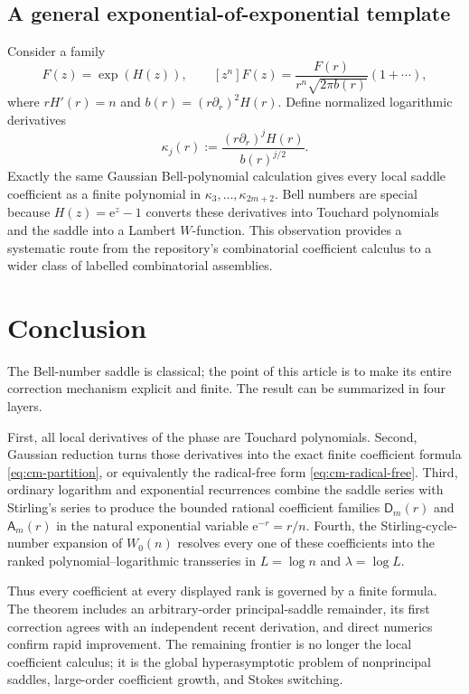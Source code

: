 \documentclass[11pt,a4paper]{article}
\theoremstyle{definition}
\theoremstyle{remark}
\newcommand{\ee}{\mathrm e}
\newcommand{\cA}{\mathsf A}
\newcommand{\cD}{\mathsf D}
\begin{document}
\subsection{A general exponential-of-exponential template}

Consider a family
\begin{equation}\label{eq:general-template}
 F(z)=\exp(H(z)),
 \qquad
 [z^n]F(z)=\frac{F(r)}{r^n\sqrt{2\pi b(r)}}
           \left(1+\cdots\right),
\end{equation}
where \(rH'(r)=n\) and
\(b(r)=(r\partial_r)^2H(r)\).  Define normalized logarithmic derivatives
\begin{equation}\label{eq:general-cumulants}
 \kappa_j(r):=\frac{(r\partial_r)^jH(r)}{b(r)^{j/2}}.
\end{equation}
Exactly the same Gaussian Bell-polynomial calculation gives every local
saddle coefficient as a finite polynomial in
\(\kappa_3,\ldots,\kappa_{2m+2}\).  Bell numbers are special because
\(H(z)=\ee^z-1\) converts these derivatives into Touchard polynomials and the
saddle into a Lambert \(W\)-function.  This observation provides a systematic
route from the repository's combinatorial coefficient calculus to a wider
class of labelled combinatorial assemblies.

\section{Conclusion}\label{sec:conclusion}

The Bell-number saddle is classical; the point of this article is to make its
entire correction mechanism explicit and finite.  The result can be summarized
in four layers.

First, all local derivatives of the phase are Touchard polynomials.  Second,
Gaussian reduction turns those derivatives into the exact finite coefficient
formula \cref{eq:cm-partition}, or equivalently the radical-free form
\cref{eq:cm-radical-free}.  Third, ordinary logarithm and exponential
recurrences combine the saddle series with Stirling's series to produce the
bounded rational coefficient families \(\cD_m(r)\) and \(\cA_m(r)\) in the
natural exponential variable \(\ee^{-r}=r/n\).  Fourth, the
Stirling-cycle-number expansion of \(W_0(n)\) resolves every one of these
coefficients into the ranked polynomial--logarithmic transseries in
\(L=\log n\) and \(\lambda=\log L\).

Thus every coefficient at every displayed rank is governed by a finite
formula.  The theorem includes an arbitrary-order principal-saddle remainder,
its first correction agrees with an independent recent derivation, and direct
numerics confirm rapid improvement.  The remaining frontier is no longer the
local coefficient calculus; it is the global hyperasymptotic problem of
nonprincipal saddles, large-order coefficient growth, and Stokes switching.
\end{document}
